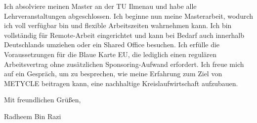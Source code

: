 \documentclass[11pt,a4paper]{coverletter}
\begin{document}
\bulletsend

Ich absolviere meinen Master an der TU Ilmenau und habe alle Lehrveranstaltungen abgeschlossen. Ich beginne nun meine Masterarbeit, wodurch ich voll verfügbar bin und flexible Arbeitszeiten wahrnehmen kann. Ich bin vollständig für Remote-Arbeit eingerichtet und kann bei Bedarf auch innerhalb Deutschlands umziehen oder ein Shared Office besuchen. Ich erfülle die Voraussetzungen für die Blaue Karte EU, die lediglich einen regulären Arbeitsvertrag ohne zusätzlichen Sponsoring-Aufwand erfordert. Ich freue mich auf ein Gespräch, um zu besprechen, wie meine Erfahrung zum Ziel von METYCLE beitragen kann, eine nachhaltige Kreislaufwirtschaft aufzubauen.

\closing{Mit freundlichen Grüßen,}{Radheem Bin Razi}
\end{document}
